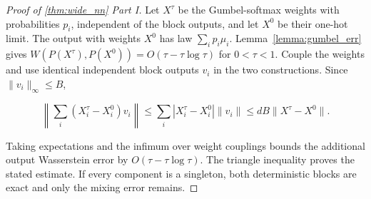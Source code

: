 \begin{proof}[Proof of \cref{thm:wide_nn} Part I]
Let $X^\tau$ be the Gumbel-softmax weights with probabilities $p_i$, independent of the block outputs, and let $X^0$ be their one-hot limit. The output with weights $X^0$ has law $\sum_i p_i\hat\mu_i$. Lemma~\ref{lemma:gumbel_err} gives $W(P(X^\tau),P(X^0))=O(\tau-\tau\log\tau)$ for $0<\tau<1$. Couple the weights and use identical independent block outputs $v_i$ in the two constructions. Since $\|v_i\|_\infty\leqslant B$,

\[
\left\|\sum_i(X_i^\tau-X_i^0)v_i\right\|\leqslant\sum_i|X_i^\tau-X_i^0|\|v_i\|\leqslant dB\|X^\tau-X^0\|.
\]

Taking expectations and the infimum over weight couplings bounds the additional output Wasserstein error by $O(\tau-\tau\log\tau)$. The triangle inequality proves the stated estimate. If every component is a singleton, both deterministic blocks are exact and only the mixing error remains. 
    \end{proof}

